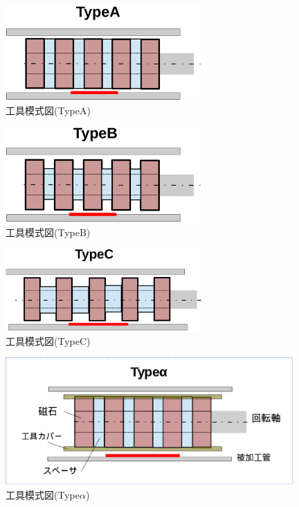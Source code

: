 \documentclass[11pt]{jarticle}
\begin{document}
  \begin{figure}[H]
    \begin{center}
      \includegraphics[width=75mm]{TypeA_sd.eps}
    \end{center}
    \caption{工具模式図(TypeA)}
    \label{fig:TypeA_sd}
  \end{figure}

  \begin{figure}[H]
    \begin{center}
      \includegraphics[width=75mm]{TypeB_sd.eps}
    \end{center}
    \caption{工具模式図(TypeB)}
    \label{fig:TypeB_sd}
  \end{figure}

  \begin{figure}[H]
    \begin{center}
      \includegraphics[width=75mm]{TypeC_sd.eps}
    \end{center}
    \caption{工具模式図(TypeC)}
    \label{fig:TypeC_sd}
  \end{figure}

  \begin{figure}[H]
    \begin{center}
      \includegraphics[width=110mm]{Typealpha_sd.eps}
    \end{center}
    \caption{工具模式図(Type$\alpha$)}
    \label{fig:Typealpha_sd}
  \end{figure}
\end{document}
